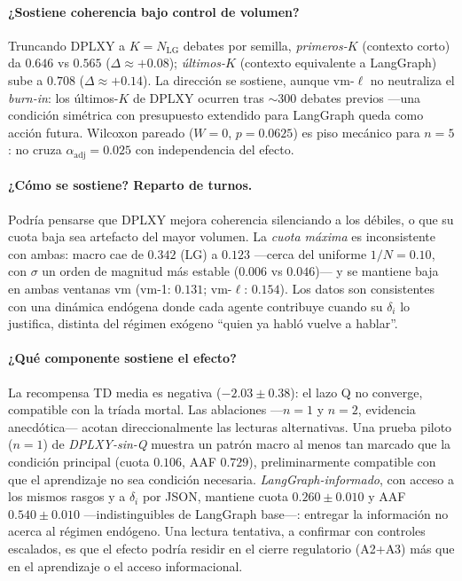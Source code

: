 \documentclass{llncs}
\begin{document}
\paragraph{¿Sostiene coherencia bajo control de volumen?} Truncando
DPLXY a $K{=}N_{\text{LG}}$ debates por semilla, \emph{primeros-$K$}
(contexto corto) da $0.646$ vs $0.565$ ($\Delta{\approx}{+}0.08$);
\emph{\'ultimos-$K$} (contexto equivalente a LangGraph) sube a
$0.708$ ($\Delta{\approx}{+}0.14$). La direcci\'on se sostiene,
aunque vm-$\ell$ no neutraliza el \emph{burn-in}: los \'ultimos-$K$
de DPLXY ocurren tras ${\sim}300$ debates previos ---una
condici\'on sim\'etrica con presupuesto extendido para LangGraph
queda como acci\'on futura. Wilcoxon pareado ($W{=}0$,
$p{=}0.0625$) es piso mec\'anico para $n{=}5$: no cruza
$\alpha_{\text{adj}}{=}0.025$ con independencia del efecto.

\paragraph{¿C\'omo se sostiene? Reparto de turnos.} Podr\'ia
pensarse que DPLXY mejora coherencia silenciando a los d\'ebiles,
o que su cuota baja sea artefacto del mayor volumen. La
\emph{cuota m\'axima} es inconsistente con ambas: macro cae de
$0.342$ (LG) a $0.123$ ---cerca del uniforme $1/N{=}0.10$, con
$\sigma$ un orden de magnitud m\'as estable ($0.006$ vs
$0.046$)--- y se mantiene baja en ambas ventanas vm (vm-1:
$0.131$; vm-$\ell$: $0.154$). Los datos son consistentes con una
din\'amica end\'ogena donde cada agente contribuye cuando su
$\delta_i$ lo justifica, distinta del r\'egimen ex\'ogeno
``quien ya habl\'o vuelve a hablar''.

\paragraph{¿Qu\'e componente sostiene el efecto?} La
recompensa TD media es negativa ($-2.03\pm0.38$): el lazo Q no
converge, compatible con la tr\'iada mortal. Las ablaciones
---$n{=}1$ y $n{=}2$, evidencia anecd\'otica--- acotan
direccionalmente las lecturas alternativas. Una prueba piloto
($n{=}1$) de \emph{DPLXY-sin-Q} muestra un patr\'on macro al menos
tan marcado que la condici\'on principal (cuota $0.106$, AAF
$0.729$), preliminarmente compatible con que el aprendizaje no sea
condici\'on necesaria. \emph{LangGraph-informado}, con acceso a
los mismos rasgos y a $\delta_i$ por JSON, mantiene cuota
$0.260\pm0.010$ y AAF $0.540\pm0.010$ ---indistinguibles de
LangGraph base---: entregar la informaci\'on no acerca al
r\'egimen end\'ogeno. Una lectura tentativa, a confirmar con
controles escalados, es que el efecto podr\'ia residir en el cierre
regulatorio (A2{+}A3) m\'as que en el aprendizaje o el acceso
informacional.
\end{document}

